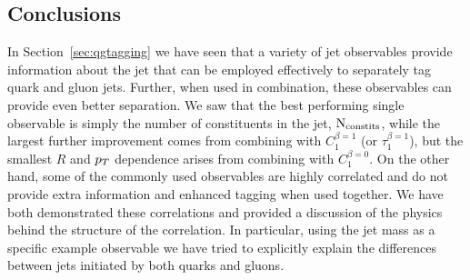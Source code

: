  \subsection{Conclusions}\label{sec:qg_concl}

In Section~\ref{sec:qgtagging} we have seen that a variety of jet observables
 provide information about the jet that can be employed effectively to separately tag quark and gluon jets.  Further,
when used in combination, these observables can provide even better separation.  We saw that the best performing single observable is simply the number of
constituents in the jet, $\rm{N_ {constits}}$,  while the largest further improvement comes from combining with $C_1^{\beta =1}$ (or $\tau_1^{\beta=1}$), 
but the smallest
$R$ and $p_T$ dependence arises from combining with $C_1^{\beta = 0}$.  On the other hand, some of the commonly used observables are highly correlated
and do not provide extra information and enhanced tagging when used together.  We have both demonstrated these correlations and provided a discussion of the 
physics behind the structure of the correlation.  In particular, using the jet mass as a specific example observable we have tried to explicitly explain the differences between jets 
initiated by both quarks and gluons. 
 